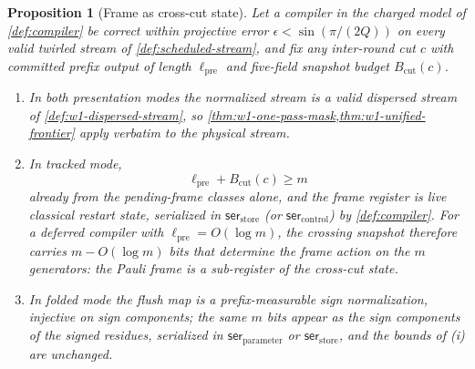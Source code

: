 \documentclass[a4paper,twocolumn,10pt,unpublished]{quantumarticle}
\newtheorem{proposition}{Proposition}
\begin{document}
\begin{proposition}[Frame as cross-cut state]
\label{prop:frame-cross-cut}
Let a compiler in the charged model of \cref{def:compiler} be correct
within projective error $\epsilon<\sin(\pi/(2Q))$ on every valid twirled
stream of \cref{def:scheduled-stream}, and fix any inter-round cut $c$
with committed prefix output of length $\ell_{\mathrm{pre}}$ and
five-field snapshot budget $B_{\mathrm{cut}}(c)$.
\begin{enumerate}[leftmargin=1.9em,label=(\roman*)]
\item In both presentation modes the normalized stream is a valid
dispersed stream of \cref{def:w1-dispersed-stream}, so
\cref{thm:w1-one-pass-mask,thm:w1-unified-frontier} apply verbatim to
the physical stream.
\item In tracked mode,
\begin{equation}\label{eq:frame-lower}
 \ell_{\mathrm{pre}}+B_{\mathrm{cut}}(c)\geq m
\end{equation}
already from the pending-frame classes alone, and the frame register is
live classical restart state, serialized in
$\mathsf{ser}_{\mathrm{store}}$ (or $\mathsf{ser}_{\mathrm{control}}$)
by \cref{def:compiler}.  For a deferred compiler with
$\ell_{\mathrm{pre}}=O(\log m)$, the crossing snapshot therefore
carries $m-O(\log m)$ bits that determine the frame action on the $m$
generators: the Pauli frame is a sub-register of the cross-cut state.
\item In folded mode the flush map is a prefix-measurable sign
normalization, injective on sign components; the same $m$ bits appear
as the sign components of the signed residues, serialized in
$\mathsf{ser}_{\mathrm{parameter}}$ or $\mathsf{ser}_{\mathrm{store}}$,
and the bounds of (i) are unchanged.
\end{enumerate}
\end{proposition}
\end{document}

